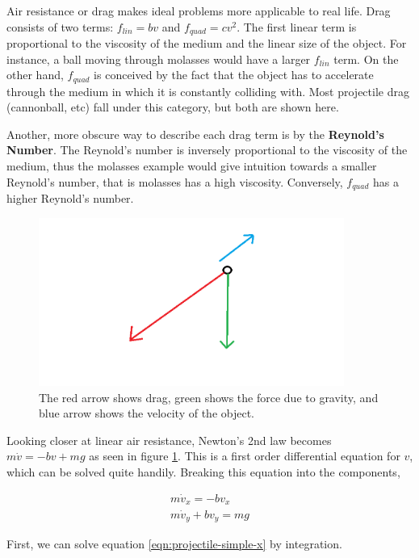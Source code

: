 
Air resistance or drag makes ideal problems more applicable to real life. Drag consists of two terms: $f_{lin} = bv$ and $f_{quad} = cv^2$. The first linear term is proportional to the viscosity of the medium and the linear size of the object. For instance, a ball moving through molasses would have a larger $f_{lin}$ term. On the other hand, $f_{quad}$ is conceived by the fact that the object has to accelerate through the medium in which it is constantly colliding with. Most projectile drag (cannonball, etc) fall under this category, but both are shown here.

Another, more obscure way to describe each drag term is by the {\bfseries Reynold's Number}. The Reynold's number is inversely proportional to the viscosity of the medium, thus the molasses example would give intuition towards a smaller Reynold's number, that is molasses has a high viscosity. Conversely, $f_{quad}$ has a higher Reynold's number.

\begin{figure}[h]
    \centering
    \includegraphics[width=10cm]{Classical_Mechanics/2.3-projectiles/projectile-simple.png}
    \caption{The red arrow shows drag, green shows the force due to gravity, and blue arrow shows the velocity of the object.}
    \label{fig:simple-projectile}
\end{figure}

Looking closer at linear air resistance, Newton's 2nd law becomes $m \dot v = -b v + mg$ as seen in figure \ref{fig:simple-projectile}. This is a first order differential equation for $v$, which can be solved quite handily. Breaking this equation into the components,

\begin{align}
    \label{eqn:projectile-simple-x}
    m\dot v_x = -b v_x \\
    \label{eqn:projectile-simple-y}
    m\dot v_y + b v_y = mg
\end{align}

First, we can solve equation \ref{eqn:projectile-simple-x} by integration.

